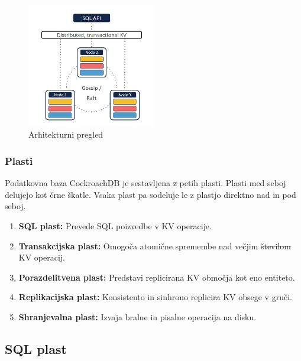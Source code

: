 \documentclass[a4paper, 12pt]{book}
\providecommand{\DIFaddtex}[1]{{\protect\color{blue}\uwave{#1}}} %
\providecommand{\DIFdeltex}[1]{{\protect\color{red}\sout{#1}}}                      %
\providecommand{\DIFaddbegin}{} %
\providecommand{\DIFaddend}{} %
\providecommand{\DIFdelbegin}{} %
\providecommand{\DIFdelend}{} %
\providecommand{\DIFadd}[1]{\texorpdfstring{\DIFaddtex{#1}}{#1}} %
\providecommand{\DIFdel}[1]{\texorpdfstring{\DIFdeltex{#1}}{}} %
\newcommand{\DIFscaledelfig}{0.5}
\newlength{\DIFdelgraphicswidth} %
\newlength{\DIFdelgraphicsheight} %
\newcommand{\DIFaddincludegraphics}[2][]{{\color{blue}\fbox{\DIFOincludegraphics[#1]{#2}}}} %
\newcommand{\DIFdelincludegraphics}[2][]{%
\sbox{\DIFdelgraphicsbox}{\DIFOincludegraphics[#1]{#2}}%
\settoboxwidth{\DIFdelgraphicswidth}{\DIFdelgraphicsbox} %
\settoboxtotalheight{\DIFdelgraphicsheight}{\DIFdelgraphicsbox} %
\scalebox{\DIFscaledelfig}{%
\parbox[b]{\DIFdelgraphicswidth}{\usebox{\DIFdelgraphicsbox}\\[-\baselineskip] \rule{\DIFdelgraphicswidth}{0em}}\llap{\resizebox{\DIFdelgraphicswidth}{\DIFdelgraphicsheight}{%
\setlength{\unitlength}{\DIFdelgraphicswidth}%
\begin{picture}(1,1)%
\thicklines\linethickness{2pt} %
{\color[rgb]{1,0,0}\put(0,0){\framebox(1,1){}}}%
{\color[rgb]{1,0,0}\put(0,0){\line( 1,1){1}}}%
{\color[rgb]{1,0,0}\put(0,1){\line(1,-1){1}}}%
\end{picture}%
}\hspace*{3pt}}} %
} %
\DeclareRobustCommand{\DIFaddbegin}{\DIFOaddbegin \let\includegraphics\DIFaddincludegraphics} %
\DeclareRobustCommand{\DIFaddend}{\DIFOaddend \let\includegraphics\DIFOincludegraphics} %
\DeclareRobustCommand{\DIFdelbegin}{\DIFOdelbegin \let\includegraphics\DIFdelincludegraphics} %
\DeclareRobustCommand{\DIFdelend}{\DIFOaddend \let\includegraphics\DIFOincludegraphics} %
\begin{document}
\begin{figure}[H]
\begin{center}
\includegraphics[width=0.5\textwidth]{resources/crdb-arhitecture-overview.png}
\end{center}
\caption{Arhitekturni pregled \cite{CRDB-2017}}
\label{img_crdb_arhitecture_overview}
\end{figure}

\subsubsection{Plasti}
Podatkovna baza CockroachDB je sestavljena \DIFdelbegin \DIFdel{z }\DIFdelend \DIFaddbegin \DIFadd{iz }\DIFaddend petih plasti. Plasti med seboj delujejo kot črne škatle. Vsaka plast pa sodeluje le z plastjo direktno nad in pod seboj.

\begin{enumerate}
    \item \textbf{SQL plast:} Prevede SQL poizvedbe v KV operacije.
    \item \textbf{Transakcijska plast:} Omogoča atomične spremembe nad večjim \DIFdelbegin \DIFdel{številom }\DIFdelend \DIFaddbegin \DIFadd{šte\-vi\-lom }\DIFaddend KV operacij.
    \item \textbf{Porazdelitvena plast:} Predstavi replicirana KV območja kot eno entiteto.
    \item \textbf{Replikacijska plast:} Konsistento in sinhrono replicira KV obsege v gruči.
    \item \textbf{Shranjevalna plast:} Izvaja bralne in pisalne operacija na disku.
\end{enumerate}

\subsection{SQL plast}
\end{document}
